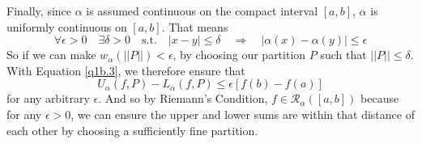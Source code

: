 \documentclass[12pt]{article}
\theoremstyle{plain}
\theoremstyle{definition}
\theoremstyle{remark}
\begin{document}
\begin{enumerate}
\begin{enumerate}
        Finally, since $\alpha$ is assumed continuous on the
        compact interval $[a,b]$, $\alpha$ is uniformly 
        continuous on $[a,b]$.  That means
        \[ \forall \epsilon > 0 \quad \exists \delta >0 
            \quad \text{s.t.} \quad |x-y| \leq \delta \quad
            \Rightarrow \quad
            |\alpha(x) -\alpha(y)| \leq \epsilon \]
        So if we can make $w_\alpha\left(||P||\right) < \epsilon$,
        by choosing our partition $P$ such that 
        $||P|| \leq \delta$.
        With Equation \ref{q1b.3}, we therefore ensure that
        \begin{equation}
             U_\alpha(f,P) - L_\alpha(f,P) 
            \leq \epsilon [f(b) -f(a)]
        \end{equation}
        for any arbitrary $\epsilon$.
        And so by Riemann's Condition, $f \in 
        \mathscr{R}_\alpha([a,b])$ because for any
        $\epsilon>0$, we can ensure the upper and lower sums 
        are within that distance of each other by choosing
        a sufficiently fine partition.

    \end{enumerate}


\end{enumerate}
\end{document}
